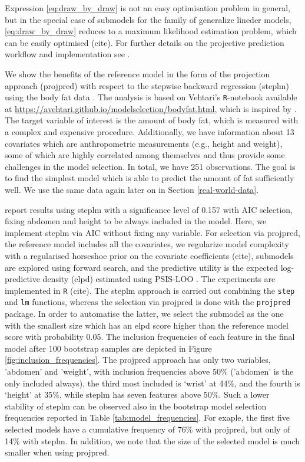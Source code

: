 \documentclass[american,]{article}
\theoremstyle{definition}
\begin{document}
Expression \eqref{eq:draw_by_draw} is not an easy optimisation problem in general, but in the special case of submodels for the family of generalize lineder models, \eqref{eq:draw_by_draw} reduces to a maximum likelihood estimation problem, which can be easily optimised (cite). For further details on the projective prediction workflow and implementation see \cite{paper:projpred}.

We show the benefits of the reference model in the form of the projection approach (projpred) with respect to the stepwise backward regression (steplm) using the body fat data \citep{johnson1996fitting}. The analysis is based on Vehtari's \texttt{R}-notebook available at \url{https://avehtari.github.io/modelselection/bodyfat.html}, which is inspired by \cite{paper:bodyfat}. The target variable of interest is the amount of body fat, which is measured with a complex and expensive procedure. Additionally, we have information about 13 covariates which are anthropometric measurements (e.g., height and weight), some of which are highly correlated among themselves and thus provide some challenges in the model selection. In total, we have 251 observations. The goal is to find the simplest model which is able to predict the amount of fat sufficiently well. We use the same data again later on in Section \ref{real-world-data}.

\cite{paper:bodyfat} report results using steplm with a significance level of 0.157 with AIC selection, fixing abdomen and height to be always included in the model. Here, we implement steplm via AIC without fixing any variable. For selection via projpred, the reference model includes all the covariates, we regularize model complexity with a regularised horseshoe prior on the covariate coefficients (cite), submodels are explored using forward search, and the predictive utility is the expected log-predictive density (elpd) estimated using PSIS-LOO \citep{paper:psis_loo}. The experiments are implemented in \texttt{R} (cite). The steplm approach is carried out combining the \texttt{step} and \texttt{lm} functions, whereas the selection via projpred is done with the \texttt{projpred} package. In order to automatise the latter, we select the submodel as the one with the smallest size which has an elpd score higher than the reference model score with probability 0.05. The inclusion frequencies of each feature in the final model after 100 bootstrap samples are depicted in Figure \ref{fig:inclusion_frequencies}. The projpred approach has only two variables, 'abdomen' and 'weight', with inclusion frequencies above 50\% ('abdomen' is the only included always), the third most included is `wrist' at 44\%, and the fourth is `height' at 35\%, while steplm has seven features above 50\%. Such a lower stability of steplm can be observed also in the bootstrap model selection frequencies reported in Table \ref{tab:model_frequencies}. For exaple, the first five selected models have a cumulative frequency of 76\% with projpred, but only of 14\% with steplm. In addition, we note that the size of the selected model is much smaller when using projpred.
\end{document}
